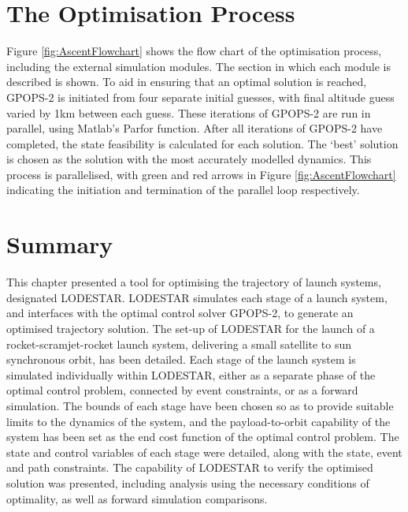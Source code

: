 \section{The Optimisation Process}

Figure \ref{fig:AscentFlowchart} shows the flow chart of the optimisation process, including the external simulation modules. The section in which each module is described is shown. To aid in ensuring that an optimal solution is reached, GPOPS-2 is initiated from four separate initial guesses, with final altitude guess varied by 1km between each guess. These iterations of GPOPS-2 are run in parallel, using Matlab's \textsf{Parfor} function. After all iterations of GPOPS-2 have completed, the state feasibility is calculated for each solution. The `best' solution is chosen as the solution with the most accurately modelled dynamics. This process is parallelised, with green and red arrows in Figure \ref{fig:AscentFlowchart} indicating the initiation and termination of the parallel loop respectively. 




\section{Summary}
This chapter presented a tool for optimising the trajectory of launch systems, designated LODESTAR. 
LODESTAR simulates each stage of a launch system, and interfaces with the optimal control solver GPOPS-2, to generate an optimised trajectory solution. 
The set-up of LODESTAR for the launch of a rocket-scramjet-rocket launch system, delivering a small satellite to sun synchronous orbit, has been detailed. 
Each stage of the launch system is simulated individually within LODESTAR, either as a separate phase of the optimal control problem, connected by event constraints, or as a forward simulation. 
The bounds of each stage have been chosen so as to provide suitable limits to the dynamics of the system, and the payload-to-orbit capability of the system has been set as the end cost function of the optimal control problem. 
The state and control variables of each stage were detailed, along with the state, event and path constraints.
The capability of LODESTAR to verify the optimised solution was presented, including analysis using the necessary conditions of optimality, as well as forward simulation comparisons.


